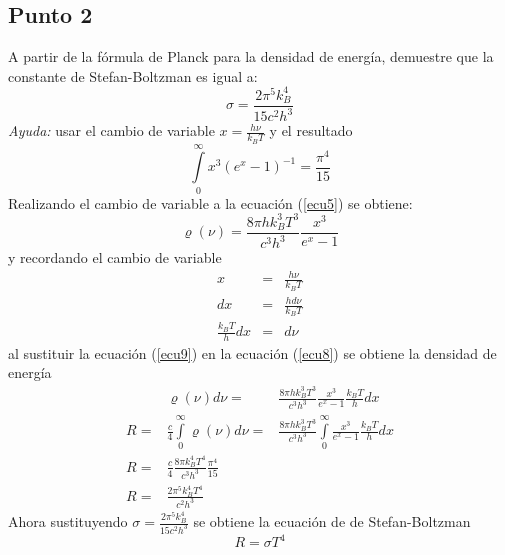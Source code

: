 \documentclass[11pt,graphicx,caption,rotating]{article}
\begin{document}
\subsection{Punto 2}
\noindent
A partir de la fórmula de Planck para la densidad de energía, demuestre que la constante de Stefan-Boltzman es igual a:
\begin{equation*}
 \sigma = \frac{2 \pi ^5 k_{B} ^4 }{15c^2h^3}
\end{equation*}
\noindent
\textit{Ayuda:} usar el cambio de variable $x=\frac{h \nu}{k_B T}$ y el resultado
\begin{equation*}
 \int\limits_0^\infty  {x^3 \left( {e^x  - 1} \right)^{ - 1} }  = \frac{{\pi ^4 }}{{15}}
\end{equation*}
\noindent
Realizando el cambio de variable a la ecuación (\ref{ecu5}) se obtiene:
\begin{equation}
 \varrho (\nu) = \frac{{8\pi hk_B ^3 T^3 }}{{c^3 h^3 }}\frac{{x^3 }}{{e^x  - 1}}
\label{ecu8}
\end{equation}
\noindent
y recordando el cambio de variable
\begin{eqnarray}
 x & = & \frac{h \nu}{k_B T}\nonumber \\
 dx & = & \frac{h d\nu}{k_B T} \nonumber \\
\frac{k_B T}{h} dx & = & d\nu \label{ecu9}
\end{eqnarray}
\noindent
al sustituir la ecuación (\ref{ecu9}) en la ecuación (\ref{ecu8}) se obtiene la densidad de energía
\begin{eqnarray}
& \varrho (\nu) d\nu = & \frac{{8\pi hk_B ^3 T^3 }}{{c^3 h^3 }}\frac{{x^3 }}{{e^x  - 1}}\frac{k_B T}{h} dx\nonumber \\
R = & \frac{c}{4} \int\limits_0^\infty  {\varrho (\nu) d\nu} = & \frac{{8\pi hk_B ^3 T^3 }}{{c^3 h^3 }}\int\limits_0^\infty  {\frac{{x^3 }}{{e^x  - 1}}\frac{{k_B T}}{h}} dx\nonumber \\
R = & \frac{c}{4}\frac{8\pi k_B ^4 T^4 }{c^3 h^3 } \frac{\pi^4 }{15} & \nonumber \\
R = & \frac{2\pi^5 k_B ^4 T^4 }{c^2 h^3 } & \label{ecu10}
\end{eqnarray}
\noindent
Ahora sustituyendo $\sigma = \frac{2 \pi ^5 k_{B} ^4 }{15c^2h^3}$ se obtiene la ecuación de de Stefan-Boltzman
\begin{equation}
 R=\sigma T ^4
\label{ecu11}
\end{equation}
\end{document}
